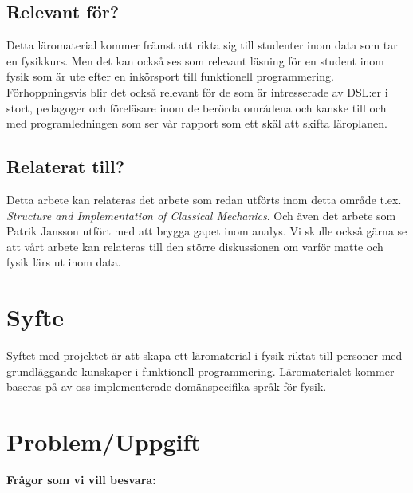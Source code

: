 \documentclass[12pt,a4paper]{scrartcl}
\begin{document}
\subsection{Relevant för?}

Detta läromaterial kommer främst att rikta sig till studenter inom data som tar en fysikkurs. Men det kan också ses som relevant läsning för en student inom fysik som är ute efter en inkörsport till funktionell programmering. Förhoppningsvis blir det också relevant för de som är intresserade av DSL:er i stort, pedagoger och föreläsare inom de berörda områdena och kanske till och med programledningen som ser vår rapport som ett skäl att skifta läroplanen.

\subsection{Relaterat till?}

Detta arbete kan relateras det arbete som redan utförts inom detta område t.ex. \textit{Structure and Implementation of Classical Mechanics}. Och även det arbete som Patrik Jansson utfört med att brygga gapet inom analys. Vi skulle också gärna se att vårt arbete kan relateras till den större diskussionen om varför matte och fysik lärs ut inom data.


\section{Syfte}

Syftet med projektet är att skapa ett läromaterial i fysik riktat till personer med grundläggande kunskaper i funktionell programmering. Läromaterialet kommer baseras på av oss implementerade domänspecifika språk för fysik.

%

\section{Problem/Uppgift}

\textbf{Frågor som vi vill besvara:}
\end{document}
